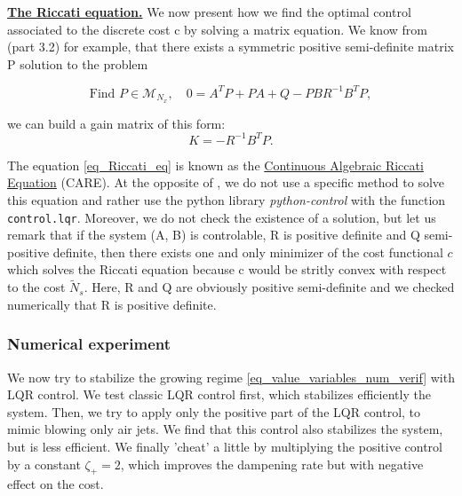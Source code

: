 \documentclass[12pt]{article}
\begin{document}
\underline{\textbf{The Riccati equation.}} We now present how we find the optimal control associated to the discrete cost c by solving a 
matrix equation. We know from \cite{holroyd2023linearquadraticregulationcontrol} (part 3.2) for example, that there exists a symmetric positive semi-definite
matrix P solution to the problem

\begin{equation}\label{eq_Riccati_eq}
    \text{Find } P\in \mathcal{M}_{N_x}, \quad 0=A^TP+PA+Q-PBR^{-1}B^TP, 
\end{equation}

 we can build a gain matrix of this form:
 \begin{equation}
    K = -R^{-1}B^TP.
 \end{equation}
 
 The equation \eqref{eq_Riccati_eq} is known as the \underline{Continuous Algebraic Riccati Equation} (CARE). At the opposite of
  \cite{holroyd2023linearquadraticregulationcontrol}, we do not use a specific method to solve this equation and rather use the python 
  library \textit{python-control} with the function \texttt{control.lqr}. Moreover, we do not check the existence of a solution, but let us 
  remark that if the system (A, B) is controlable,  R is positive definite and Q semi-positive definite, then
   there exists one and only minimizer of the cost functional $c$ which solves the Riccati equation because c would be stritly convex
   with respect to the cost $\tilde{N}_s$. Here, R and Q are obviously positive 
   semi-definite and we checked numerically that R is positive definite. 

 

\subsubsection{Numerical experiment}
We now try to stabilize the growing regime \eqref{eq_value_variables_num_verif} with LQR
control. We test classic LQR control first, which stabilizes efficiently the system. Then,
we try to apply only the positive part of the LQR control, to mimic blowing only air jets.
We find that this control also stabilizes the system, but is less efficient. We finally 'cheat' a little
by multiplying the positive control by a constant $\zeta_+=2$, which improves the dampening 
rate but with negative effect on the cost.
\\
\end{document}
